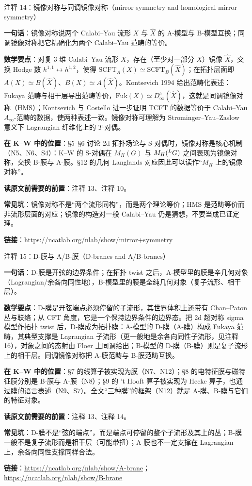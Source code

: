 \begin{kcard}{注释 14：镜像对称与同调镜像对称（mirror symmetry and homological mirror symmetry）}

\textbf{一句话}：镜像对称说两个 Calabi--Yau 流形 $X$ 与 $\widehat X$ 的 A-模型与 B-模型互换；同调镜像对称把它精确化为两个 Calabi--Yau 范畴的等价。

\textbf{数学要点}：对复 3 维 Calabi--Yau 流形 $X$，存在（至少对一部分 $X$）镜像 $\widehat X$，交换 Hodge 数 $h^{1,1}\leftrightarrow h^{1,2}$，使得 $\mathrm{SCFT}_A(X)\simeq\mathrm{SCFT}_B(\widehat X)$；在拓扑层面即 $A(X)\simeq B(\widehat X)$、$B(X)\simeq A(\widehat X)$。Kontsevich 1994 给出范畴化表述：Fukaya 范畴与相干层导出范畴等价，$\mathrm{Fuk}(X)\simeq D^b_\infty(\widehat X)$，这就是同调镜像对称（HMS）；Kontsevich 与 Costello 进一步证明 TCFT 的数据等价于 Calabi--Yau $A_\infty$-范畴的数据，使两种表述一致。镜像对称可理解为 Strominger--Yau--Zaslow 意义下 Lagrangian 纤维化上的 $T$-对偶。

\textbf{在 K--W 中的位置}：§5--§6 讨论 2d 拓扑场论与 S-对偶时，镜像对称是核心机制（N5、N6、S4）：K--W 的 S-对偶在 $M_H(G)$ 与 $M_H({}^{L}G)$ 之间表现为镜像对称，交换 B-膜与 A-膜。§12 的几何 Langlands 对应因此可以读作“$M_H$ 上的镜像对称”。

\textbf{读原文前需要的前置}：注释 13、注释 10。

\textbf{常见坑}：镜像对称不是“两个流形同构”，而是两个理论等价；HMS 是范畴等价而非流形层面的对应；镜像的构造对一般 Calabi--Yau 仍是猜想，不要当成已证定理。

\noindent\textbf{链接}：\url{https://ncatlab.org/nlab/show/mirror+symmetry}
\end{kcard}

\begin{kcard}{注释 15：D-膜与 A/B-膜（D-branes and A/B-branes）}

\textbf{一句话}：D-膜是开弦的边界条件；在拓扑 twist 之后，A-模型里的膜是辛几何对象（Lagrangian/余各向同性地），B-模型里的膜是全纯几何对象（复子流形、相干层）。

\textbf{数学要点}：D-膜是开弦端点必须停留的子流形，其世界体积上还带有 Chan--Paton 丛与联络；从 CFT 角度，它是一个保持边界条件的边界态。把 2d 超对称 sigma 模型作拓扑 twist 后，D-膜成为拓扑膜：A-模型的 D-膜（A-膜）构成 Fukaya 范畴，其典型支撑是 Lagrangian 子流形（更一般地是余各向同性子流形，见注释 16），对象之间的态射由 Floer 上同调给出；B-模型的 D-膜（B-膜）则是复子流形上的相干层。同调镜像对称把 A-膜范畴与 B-膜范畴互换。

\textbf{在 K--W 中的位置}：§7 的线算子被实现为膜（N7、N12）；§8 的电特征膜与磁特征膜分别是 B-膜与 A-膜（N8）；§9 的 't Hooft 算子被实现为 Hecke 算子，也通过膜的语言表述（N9、S7）。全文“三种膜”的框架（N12）就是 A-膜、B-膜与它们的特征对象。

\textbf{读原文前需要的前置}：注释 13、注释 14。

\textbf{常见坑}：D-膜不是“弦的端点”，而是端点可停留的整个子流形及其上的丛；B-膜一般不是复子流形而是相干层（可能带扭）；A-膜也不一定支撑在 Lagrangian 上，余各向同性支撑同样合法。

\noindent\textbf{链接}：\url{https://ncatlab.org/nlab/show/A-brane}；\url{https://ncatlab.org/nlab/show/B-brane}
\end{kcard}

